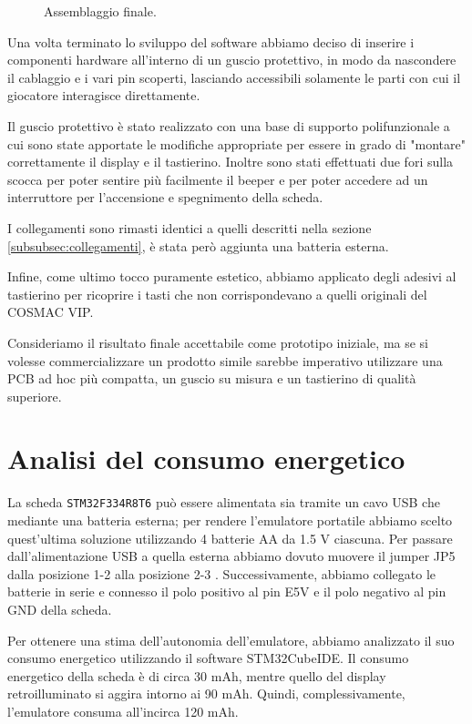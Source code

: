 \documentclass[a4paper]{article}
\begin{document}
\begin{figure}[h!t]
\begin{center}
    \end{center}
    \caption{Assemblaggio finale.}
    \label{fig:assemblaggio}
\end{figure}

Una volta terminato lo sviluppo del software abbiamo deciso di inserire i componenti hardware
all'interno di un guscio protettivo, in modo da nascondere il cablaggio e i vari pin scoperti,
lasciando accessibili solamente le parti con cui il giocatore interagisce direttamente.

Il guscio protettivo è stato realizzato con una base di supporto polifunzionale \cite{gewiss}
a cui sono state apportate le modifiche appropriate per essere in grado di "montare" correttamente
il display e il tastierino. Inoltre sono stati effettuati due fori sulla scocca per poter sentire
più facilmente il beeper e per poter accedere ad un interruttore per l'accensione e spegnimento
della scheda.

I collegamenti sono rimasti identici a quelli descritti nella sezione
\ref{subsubsec:collegamenti}, è stata però aggiunta una batteria esterna.

Infine, come ultimo tocco puramente estetico, abbiamo applicato degli adesivi al tastierino
per ricoprire i tasti che non corrispondevano a quelli originali del COSMAC VIP.

Consideriamo il risultato finale accettabile come prototipo iniziale, ma se si volesse
commercializzare un prodotto simile sarebbe imperativo utilizzare una PCB ad hoc più compatta,
un guscio su misura e un tastierino di qualità superiore.

\clearpage

\section{Analisi del consumo energetico}

La scheda \texttt{STM32F334R8T6} può essere alimentata sia tramite un cavo USB che mediante
una batteria esterna; per rendere l'emulatore portatile abbiamo scelto quest'ultima
soluzione utilizzando 4 batterie AA da 1.5 V ciascuna. Per passare dall'alimentazione USB a
quella esterna abbiamo dovuto muovere il jumper JP5 dalla posizione 1-2 alla posizione 2-3
\cite{stm32:usermanual}. Successivamente, abbiamo collegato le batterie in serie e connesso
il polo positivo al pin E5V e il polo negativo al pin GND della scheda.

Per ottenere una stima dell'autonomia dell'emulatore, abbiamo analizzato il suo consumo
energetico utilizzando il software STM32CubeIDE. Il consumo energetico della scheda è di
circa 30 mAh, mentre quello del display retroilluminato si aggira intorno ai 90 mAh.
Quindi, complessivamente, l'emulatore consuma all'incirca 120 mAh.
\end{document}
